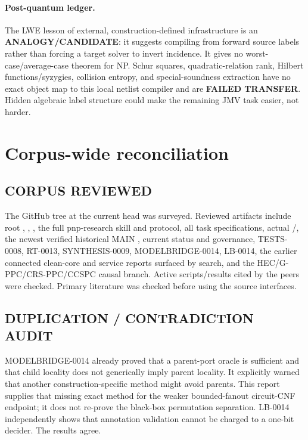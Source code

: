 \documentclass[11pt]{article}
\begin{document}
\paragraph{Post-quantum ledger.}
The LWE lesson of external, construction-defined infrastructure is an
\textbf{ANALOGY/CANDIDATE}: it suggests compiling from forward source
labels rather than forcing a target solver to invert incidence.  It gives
no worst-case/average-case theorem for NP.  Schur squares,
quadratic-relation rank, Hilbert functions/syzygies, collision entropy, and
special-soundness extraction have no exact object map to this local
netlist compiler and are \textbf{FAILED TRANSFER}.  Hidden algebraic label
structure could make the remaining JMV task easier, not harder.

\section{Corpus-wide reconciliation}

\subsection*{CORPUS REVIEWED}
The GitHub tree at the current head was surveyed.  Reviewed artifacts
include root , , , the full
pnp-research skill and protocol, all task specifications, actual
/, the newest verified historical MAIN
, current status and
governance, TESTS-0008, RT-0013, SYNTHESIS-0009, MODELBRIDGE-0014, LB-0014,
the earlier connected clean-core and service reports surfaced by search,
and the HEC/G-PPC/CRS-PPC/CCSPC causal branch.  Active scripts/results cited
by the peers were checked.  Primary literature was checked before using
the source interfaces.

\subsection*{DUPLICATION / CONTRADICTION AUDIT}
MODELBRIDGE-0014 already proved that a parent-port oracle is sufficient and
that child locality does not generically imply parent locality.  It
explicitly warned that another construction-specific method might avoid
parents.  This report supplies that missing exact method for the weaker
bounded-fanout circuit-CNF endpoint; it does not re-prove the black-box
permutation separation.  LB-0014 independently shows that annotation
validation cannot be charged to a one-bit decider.  The results agree.
\end{document}
